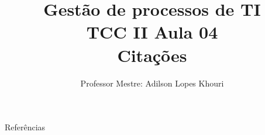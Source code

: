 \documentclass[compress, hyperref={pdfpagelayout=SinglePage}]{beamer}
\title[TCC II - Aula 04]{Gestão de processos de TI \\ TCC II Aula 04 \\ Citações}
\author{Professor Mestre: Adilson Lopes Khouri}
\begin{document}
	
	\begin{frame}
		\titlepage
	\end{frame}
	
	
	
	
	
	
	
	
		
	

	
	
		
	\begin{frame}[allowframebreaks]{}
		\begin{block}{Referências}
			\tiny
			\nocite{*}
			
	    		
	    	\end{block}
	\end{frame}
	
\end{document}
